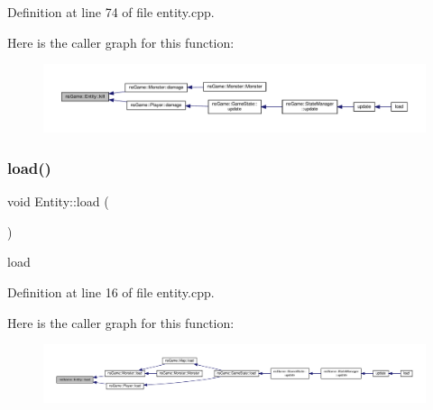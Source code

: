 Definition at line 74 of file entity.\+cpp.

Here is the caller graph for this function\+:\nopagebreak
\begin{figure}[H]
\begin{center}
\leavevmode
\includegraphics[width=350pt]{structns_game_1_1_entity_a522648b330daab91b49f78f0737a943f_icgraph}
\end{center}
\end{figure}
\mbox{\label{structns_game_1_1_entity_ae0aa595447b5f3d2c0b80fb99305c56e}} 
\subsubsection{\texorpdfstring{load()}{load()}}
{\footnotesize\ttfamily void Entity\+::load (\begin{DoxyParamCaption}{ }\end{DoxyParamCaption})}



load 



Definition at line 16 of file entity.\+cpp.

Here is the caller graph for this function\+:\nopagebreak
\begin{figure}[H]
\begin{center}
\leavevmode
\includegraphics[width=350pt]{structns_game_1_1_entity_ae0aa595447b5f3d2c0b80fb99305c56e_icgraph}
\end{center}
\end{figure}
\mbox{\label{structns_game_1_1_entity_accc47c70658884bd70938642fc1cc431}} 

